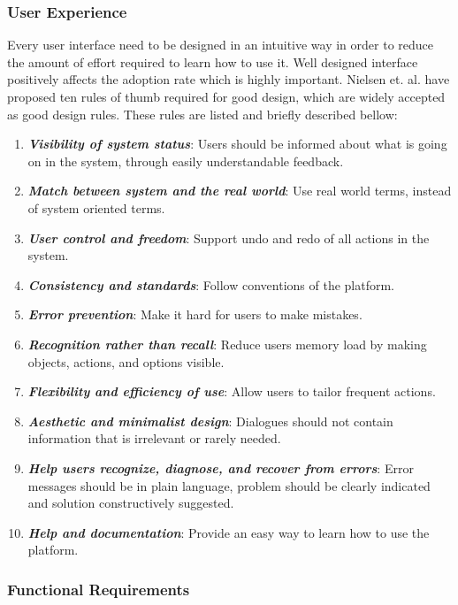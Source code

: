 \subsubsection{User Experience}

Every user interface need to be designed in an intuitive way in order to reduce the amount of effort required to learn how to use it. Well designed interface positively affects the adoption rate which is highly important. Nielsen et. al. \cite{nielsen199510,Nielsen:1994:EEP:191666.191729} have proposed ten rules of thumb required for good design, which are widely accepted as good design rules. These rules are listed and briefly described bellow:

\begin{enumerate}
	\setlength{\itemsep}{1pt}
	\item \textbf{\textit{Visibility of system status}}: Users should be informed about what is going on in the system, through easily understandable feedback.
	\item \textbf{\textit{Match between system and the real world}}: Use real world terms, instead of system oriented terms.
	\item \textbf{\textit{User control and freedom}}: Support undo and redo of all actions in the system.
	\item \textbf{\textit{Consistency and standards}}: Follow conventions of the platform.
	\item \textbf{\textit{Error prevention}}: Make it hard for users to make mistakes.
	\item \textbf{\textit{Recognition rather than recall}}: Reduce users memory load by making objects, actions, and options visible.
	\item \textbf{\textit{Flexibility and efficiency of use}}: Allow users to tailor frequent actions.
	\item \textbf{\textit{Aesthetic and minimalist design}}: Dialogues should not contain information that is irrelevant or rarely needed.
	\item \textbf{\textit{Help users recognize, diagnose, and recover from errors}}: Error messages should be in plain language, problem should be clearly indicated and solution constructively suggested.
	\item \textbf{\textit{Help and documentation}}: Provide an easy way to learn how to use the platform.
\end{enumerate}

\subsubsection{Functional Requirements}


